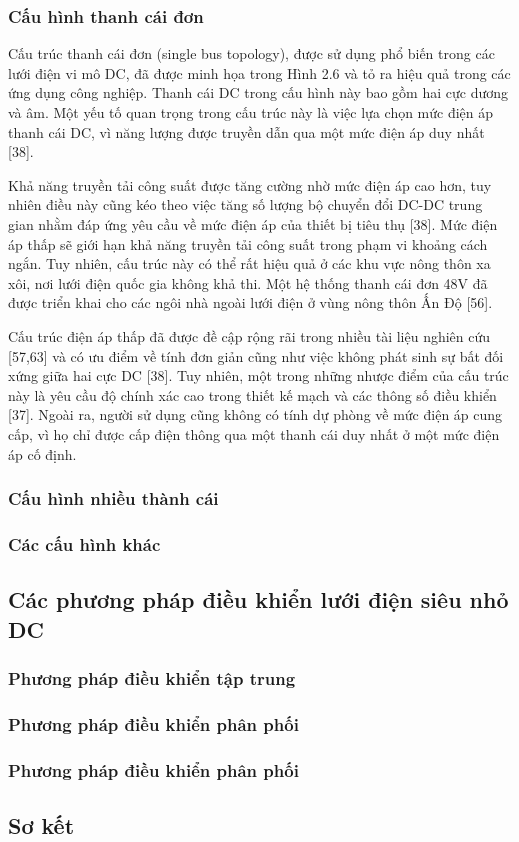\subsubsection{Cấu hình thanh cái đơn}
Cấu trúc thanh cái đơn (single bus topology), được sử dụng phổ biến trong các lưới điện vi mô DC, đã được minh họa trong Hình 2.6 và tỏ ra hiệu quả trong các ứng dụng công nghiệp. Thanh cái DC trong cấu hình này bao gồm hai cực dương và âm. Một yếu tố quan trọng trong cấu trúc này là việc lựa chọn mức điện áp thanh cái DC, vì năng lượng được truyền dẫn qua một mức điện áp duy nhất [38]. \par
Khả năng truyền tải công suất được tăng cường nhờ mức điện áp cao hơn, tuy nhiên điều này cũng kéo theo việc tăng số lượng bộ chuyển đổi DC-DC trung gian nhằm đáp ứng yêu cầu về mức điện áp của thiết bị tiêu thụ [38]. Mức điện áp thấp sẽ giới hạn khả năng truyền tải công suất trong phạm vi khoảng cách ngắn. Tuy nhiên, cấu trúc này có thể rất hiệu quả ở các khu vực nông thôn xa xôi, nơi lưới điện quốc gia không khả thi. Một hệ thống thanh cái đơn 48V đã được triển khai cho các ngôi nhà ngoài lưới điện ở vùng nông thôn Ấn Độ [56]. \par
Cấu trúc điện áp thấp đã được đề cập rộng rãi trong nhiều tài liệu nghiên cứu [57,63] và có ưu điểm về tính đơn giản cũng như việc không phát sinh sự bất đối xứng giữa hai cực DC [38]. Tuy nhiên, một trong những nhược điểm của cấu trúc này là yêu cầu độ chính xác cao trong thiết kế mạch và các thông số điều khiển [37]. Ngoài ra, người sử dụng cũng không có tính dự phòng về mức điện áp cung cấp, vì họ chỉ được cấp điện thông qua một thanh cái duy nhất ở một mức điện áp cố định. \par
\subsubsection{Cấu hình nhiều thành cái}

\subsubsection{Các cấu hình khác}

\subsection{Các phương pháp điều khiển lưới điện siêu nhỏ DC}
\subsubsection{Phương pháp điều khiển tập trung}

\subsubsection{Phương pháp điều khiển phân phối}

\subsubsection{Phương pháp điều khiển phân phối}

\subsection{Sơ kết}